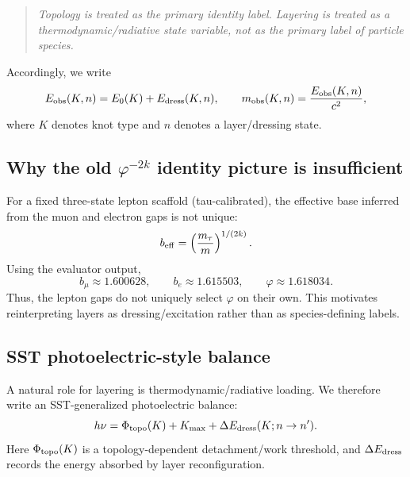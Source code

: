 \documentclass[11pt]{article}
\begin{document}
        \begin{quote}
            \emph{Topology is treated as the primary identity label. Layering is treated as a thermodynamic/radiative state variable, not as the primary label of particle species.}
        \end{quote}
        
        Accordingly, we write
        \begin{equation}
            E_{\rm obs}(K,n)=E_0(K)+E_{\rm dress}(K,n),
            \qquad
            m_{\rm obs}(K,n)=\frac{E_{\rm obs}(K,n)}{c^2},
        \end{equation}
        where \(K\) denotes knot type and \(n\) denotes a layer/dressing state.
    
    \subsection{Why the old \texorpdfstring{\(\varphi^{-2k}\)}{phi^-2k} identity picture is insufficient}
        For a fixed three-state lepton scaffold (tau-calibrated), the effective base inferred from the muon and electron gaps is not unique:
        \begin{equation}
            b_{\rm eff}=\left(\frac{m_\tau}{m}\right)^{1/(2k)}.
        \end{equation}
        Using the evaluator output,
        \[
            b_{\mu}\approx 1.600628,\qquad
            b_{e}\approx 1.615503,\qquad
            \varphi\approx 1.618034.
        \]
        Thus, the lepton gaps do not uniquely select \(\varphi\) on their own. This motivates reinterpreting layers as dressing/excitation rather than as species-defining labels.
    
    \subsection{SST photoelectric-style balance}
        A natural role for layering is thermodynamic/radiative loading. We therefore write an SST-generalized photoelectric balance:
        \begin{equation}
            h\nu
            =
            \Phi_{\rm topo}(K)
            +
            K_{\max}
            +
            \Delta E_{\rm dress}(K;n\to n').
            \label{eq:SST_photoelectric_balance}
        \end{equation}
        Here \(\Phi_{\rm topo}(K)\) is a topology-dependent detachment/work threshold, and \(\Delta E_{\rm dress}\) records the energy absorbed by layer reconfiguration.
    
\end{document}
